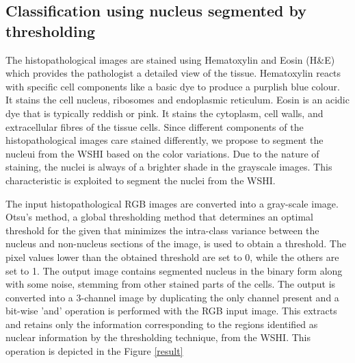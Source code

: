 \documentclass[conference]{IEEEtran}
\begin{document}

\subsection{Classification using nucleus segmented by thresholding}

 The histopathological images are stained using Hematoxylin and Eosin (H\&E) which provides the pathologist a detailed view of the tissue. Hematoxylin reacts with specific cell components like a basic dye to produce a purplish blue colour. It stains the cell nucleus, ribosomes and endoplasmic reticulum. Eosin is an acidic dye that is typically reddish or pink. It stains the cytoplasm, cell walls, and extracellular fibres of the tissue cells. Since different components of the histopathological images care stained differently, we propose  to  segment the nucleui from the WSHI based on the color variations. Due to the nature of staining, the nuclei is always of a brighter shade in the grayscale images. This characteristic is exploited to segment the nuclei from the WSHI. 
 
 The input histopathological RGB images are converted into a gray-scale image. Otsu's method, a global thresholding method that determines an optimal threshold for the given that minimizes the intra-class variance between the nucleus and non-nucleus sections of the image, is used to obtain a threshold. The pixel values lower than the obtained threshold are set to 0, while the others are set to 1. The output image contains segmented nucleus in the binary form along with some noise, stemming from other stained parts of the cells.  The output is converted into a 3-channel image by duplicating the only channel present and a bit-wise 'and' operation is performed with the RGB input image. This extracts and retains only the information corresponding to the regions identified as nuclear information by the thresholding technique, from the WSHI. This operation is depicted in the Figure \ref{result} 
\end{document}
